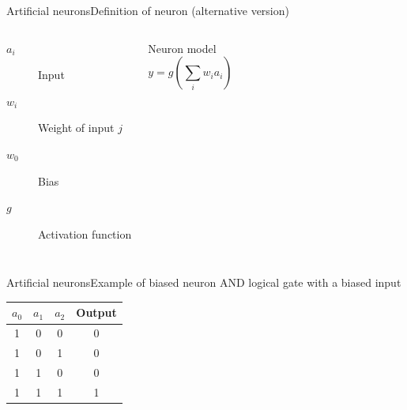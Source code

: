 \documentclass[10pt,compress]{beamer} %
\begin{document}
\begin{frame}{Artificial neurons}{Definition of neuron (alternative version)}
    

	\bigskip
    \begin{columns}
		\begin{description}
		\item[$a_i$] Input
		\item[$w_{i}$] Weight of input $j$
		\item[$w_0$] Bias
		\item[$g$] Activation function
		\end{description}

	   \begin{block}{Neuron model}
	   \vspace{-0.5cm}
	   \begin{equation*}
	   y=g\left( \sum_{i} w_{i} a_i \right)
	   \end{equation*}
	   \end{block}
    \end{columns}
\end{frame}

\begin{frame}{Artificial neurons}{Example of biased neuron}
	AND logical gate with a biased input

	\centering 

	\bigskip

	\centering \begin{tabular}{ccc|c}\hline
	$a_0$ & $a_1$ & $a_2$& Output\\\hline
	1    & 0     & 0     & 0\\
	1    & 0     & 1     & 0\\
	1    & 1     & 0     & 0\\
	1    & 1     & 1     & 1\\\hline
	\end{tabular}
\end{frame}
\end{document}
